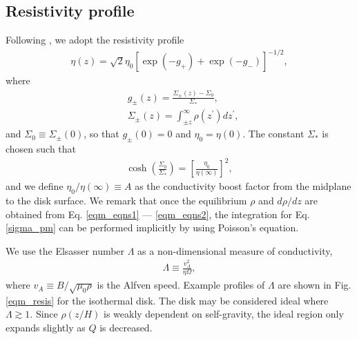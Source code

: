 \subsection{Resistivity profile}\label{resis_profile}
Following \cite{fleming03}, we adopt the resistivity profile
\begin{align}
  \eta(z) =
  \sqrt{2}\eta_0\left[\exp{\left(-g_+\right)}+\exp{\left(-g_-\right)}\right]^{-1/2},  
\end{align}
where
\begin{align}
  &g_\pm(z) =  \frac{\Sigma_\pm(z)-\Sigma_0}{\Sigma_*}, \\
  &\Sigma_\pm(z) = \int_{\pm z}^\infty\rho(z^\prime)dz^\prime, \label{sigma_pm}
\end{align}
and $\Sigma_0\equiv\Sigma_{\pm}(0)$, so that $g_\pm(0)=0$ and $\eta_0 
= \eta(0)$. The constant $\Sigma_*$ is chosen such that 
\begin{align}
  \cosh{\left(\frac{\Sigma_0}{\Sigma_*}\right)} =
  \left[\frac{\eta_0}{\eta(\infty)}\right]^2,
\end{align}
and we define $\eta_0/\eta(\infty)\equiv A$ as the conductivity
boost factor from the midplane to the disk surface. We remark that
once the equilibrium $\rho$ and $d\rho/dz$ are obtained from
Eq. \ref{eqm_eqns1} --- \ref{eqm_eqns2}, the integration for
Eq. \ref{sigma_pm} can be performed implicitly by using Poisson's 
equation. 


We use the Elsasser number $\Lambda$ as a non-dimensional measure of
conductivity,
\begin{align} 
  \Lambda \equiv \frac{v_A^2}{\eta\Omega},
\end{align}
where $v_A \equiv B/\sqrt{\mu_0\rho}$ is the Alfven speed. Example
profiles of $\Lambda$ are shown in Fig. \ref{eqm_resis} for the
isothermal disk. The disk may be considered ideal where $\Lambda
\gtrsim 1$. Since $\rho(z/H)$ is weakly dependent on  self-gravity, the
ideal region only expands slightly as $Q$ is decreased. 



